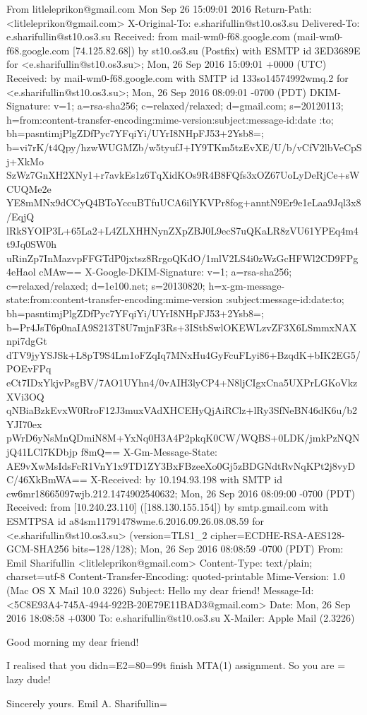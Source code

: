 \documentclass[a4paper,11pt]{article}
\begin{document}
\begin{bashcode}
From litleleprikon@gmail.com  Mon Sep 26 15:09:01 2016
Return-Path: <litleleprikon@gmail.com>
X-Original-To: e.sharifullin@st10.os3.su
Delivered-To: e.sharifullin@st10.os3.su
Received: from mail-wm0-f68.google.com (mail-wm0-f68.google.com [74.125.82.68])
    by st10.os3.su (Postfix) with ESMTP id 3ED3689E
    for <e.sharifullin@st10.os3.su>; Mon, 26 Sep 2016 15:09:01 +0000 (UTC)
Received: by mail-wm0-f68.google.com with SMTP id 133so14574992wmq.2
        for <e.sharifullin@st10.os3.su>; Mon, 26 Sep 2016 08:09:01 -0700 (PDT)
DKIM-Signature: v=1; a=rsa-sha256; c=relaxed/relaxed;
        d=gmail.com; s=20120113;
        h=from:content-transfer-encoding:mime-version:subject:message-id:date
         :to;
        bh=pasntimjPlgZDfPyc7YFqiYi/UYrI8NHpFJ53+2Ysb8=;
        b=vi7rK/t4Qpy/hzwWUGMZb/w5tyufJ+IY9TKm5tzEvXE/U/b/vCfV2lbVeCpSj+XkMo
         SzWz7GnXH2XNy1+r7avkEs1z6TqXidKOs9R4B8FQfs3xOZ67UoLyDeRjCe+sWCUQMe2e
         YE8mMNx9dCCyQ4BToYccuBTfuUCA6ilYKVPr8fog+anntN9Er9e1eLaa9Jql3x8/EqjQ
         lRkSYOIP3L+65La2+L4ZLXHHNynZXpZBJ0L9ecS7uQKaLR8zVU61YPEq4m4t9Jq0SW0h
         uRinZp7InMazvpFFGTdP0jxtsz8RrgoQKdO/1mlV2LS4i0zWzGcHFWl2CD9FPg4eHaol
         cMAw==
X-Google-DKIM-Signature: v=1; a=rsa-sha256; c=relaxed/relaxed;
        d=1e100.net; s=20130820;
        h=x-gm-message-state:from:content-transfer-encoding:mime-version
         :subject:message-id:date:to;
        bh=pasntimjPlgZDfPyc7YFqiYi/UYrI8NHpFJ53+2Ysb8=;
        b=Pr4JsT6p0naIA9S213T8U7mjnF3Rs+3IStbSwlOKEWLzvZF3X6LSmmxNAXnpi7dgGt
         dTV9jyYSJSk+L8pT9S4Lm1oFZqIq7MNxHu4GyFcuFLyi86+BzqdK+bIK2EG5/POEvFPq
         eCt7IDxYkjvPsgBV/7AO1UYhn4/0vAIH3lyCP4+N8ljCIgxCna5UXPrLGKoVkzXVi3OQ
         qNBiaBzkEvxW0RroF12J3muxVAdXHCEHyQjAiRClz+lRy3SfNeBN46dK6u/b2YJI70ex
         pWrD6yNsMnQDmiN8M+YxNq0H3A4P2pkqK0CW/WQBS+0LDK/jmkPzNQNjQ41LCl7KDbjp
         f8mQ==
X-Gm-Message-State: AE9vXwMsIdsFcR1VnY1x9TD1ZY3BxFBzeeXo0Gj5zBDGNdtRvNqKPt2j8vyDC/46XkBmWA==
X-Received: by 10.194.93.198 with SMTP id cw6mr18665097wjb.212.1474902540632;
        Mon, 26 Sep 2016 08:09:00 -0700 (PDT)
Received: from [10.240.23.110] ([188.130.155.154])
        by smtp.gmail.com with ESMTPSA id a84sm11791478wme.6.2016.09.26.08.08.59
        for <e.sharifullin@st10.os3.su>
        (version=TLS1_2 cipher=ECDHE-RSA-AES128-GCM-SHA256 bits=128/128);
        Mon, 26 Sep 2016 08:08:59 -0700 (PDT)
From: Emil Sharifullin <litleleprikon@gmail.com>
Content-Type: text/plain; charset=utf-8
Content-Transfer-Encoding: quoted-printable
Mime-Version: 1.0 (Mac OS X Mail 10.0 \(3226\))
Subject: Hello my dear friend!
Message-Id: <5C8E93A4-745A-4944-922B-20E79E11BAD3@gmail.com>
Date: Mon, 26 Sep 2016 18:08:58 +0300
To: e.sharifullin@st10.os3.su
X-Mailer: Apple Mail (2.3226)

Good morning my dear friend!

I realised that you didn=E2=80=99t finish MTA(1) assignment. So you are =
lazy dude!

Sincerely yours.
Emil A. Sharifullin=

\end{bashcode}
\end{document}

